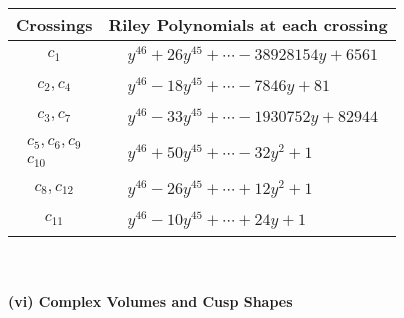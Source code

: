 \documentclass[1p]{elsarticle_modified}
\theoremstyle{definition}
\begin{document}
\begin{tabular}{m{50pt}|m{274pt}}
Crossings & \hspace{64pt}Riley Polynomials at each crossing \\
\hline $$\begin{aligned}c_{1}\end{aligned}$$&$\begin{aligned}
&y^{46}+26 y^{45}+\cdots-38928154 y+6561
\end{aligned}$\\
\hline $$\begin{aligned}c_{2},c_{4}\end{aligned}$$&$\begin{aligned}
&y^{46}-18 y^{45}+\cdots-7846 y+81
\end{aligned}$\\
\hline $$\begin{aligned}c_{3},c_{7}\end{aligned}$$&$\begin{aligned}
&y^{46}-33 y^{45}+\cdots-1930752 y+82944
\end{aligned}$\\
\hline $$\begin{aligned}c_{5},c_{6},c_{9}\\c_{10}\end{aligned}$$&$\begin{aligned}
&y^{46}+50 y^{45}+\cdots-32 y^2+1
\end{aligned}$\\
\hline $$\begin{aligned}c_{8},c_{12}\end{aligned}$$&$\begin{aligned}
&y^{46}-26 y^{45}+\cdots+12 y^2+1
\end{aligned}$\\
\hline $$\begin{aligned}c_{11}\end{aligned}$$&$\begin{aligned}
&y^{46}-10 y^{45}+\cdots+24 y+1
\end{aligned}$\\
\hline
\end{tabular}\\~\\
\newpage\flushleft \textbf{(vi) Complex Volumes and Cusp Shapes}
\end{document}
